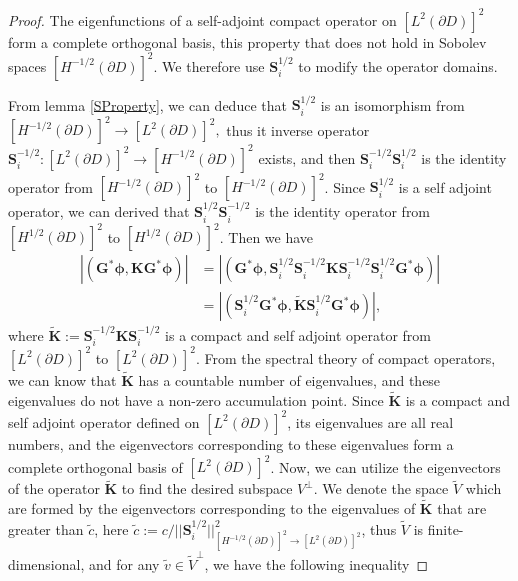 \documentclass[11pt,reqno,twoside]{amsart}
\theoremstyle{definition}
\theoremstyle{remark}
\numberwithin{equation}{section}
\begin{document}
	\begin{proof}
	The eigenfunctions of a self-adjoint compact operator on $\left[L^2(\partial D)\right]^2$ form a complete orthogonal basis, this property that does not hold in Sobolev spaces $\left[H^{-1/2}\left(\partial D\right) \right] ^2$. We therefore use $\mathbf{S}_i^{1/2}$ to modify the operator domains.
	
	From lemma \ref{SProperty}, we can deduce that $\mathbf S_{i}^{1/2}$ is an isomorphism from $\left[H^{-1/2}\left(\partial D\right) \right] ^2 \to \left[L^2\left(\partial D\right) \right] ^2 ,$  thus it inverse operator $\mathbf S_{i}^{-1/2}:\left[L^2\left(\partial D\right) \right] ^2 \to \left[H^{-1/2}\left(\partial D\right) \right] ^2$  exists, and then $\mathbf S_{i}^{-1/2} \mathbf S_{i}^{1/2}$ is the identity operator from $\left[H^{-1/2}\left(\partial D\right) \right] ^2$ to $\left[H^{-1/2}\left(\partial D\right) \right] ^2$. Since $\mathbf S_{i}^{1/2}$ is a self adjoint operator, we can derived that $\mathbf S_{i}^{1/2} \mathbf S_{i}^{-1/2}$ is the identity operator from $\left[H^{1/2}\left(\partial D\right) \right] ^2$ to $\left[H^{1/2}\left(\partial D\right) \right] ^2$. Then we have
\begin{equation}\begin{aligned} \label{eq:inequality1}
	\left|\left( \mathbf G ^* \mathbf {\phi} , \mathbf {KG}^* \mathbf {\phi}\right) \right|
	 & =\left|\left( \mathbf G ^* \mathbf {\phi}, \mathbf S_{i}^{1/2} \mathbf S_{i}^{-1/2} \mathbf K \mathbf S_{i}^{-1/2} \mathbf S_{i}^{1/2} \mathbf {G}^* \mathbf {\phi}\right)\right|\\
		& =\left|\left( \mathbf S_{i}^{1/2} \mathbf {G}^* \mathbf {\phi}, \mathbf {\tilde K}\mathbf S_{i}^{1/2} \mathbf {G}^* \mathbf {\phi} \right)\right|,
	\end{aligned}\end{equation}
	where $ \mathbf {\tilde K}:=\mathbf S_{i}^{-1/2} \mathbf K \mathbf S_{i}^{-1/2}$ is a compact and self adjoint operator from $\left[L^2\left(\partial D\right) \right] ^2$ to $\left[L^2\left(\partial D\right) \right] ^2$. From the spectral theory of compact operators, we can know that  $\mathbf {\tilde K}$ has a countable number of eigenvalues, and these eigenvalues do not have a non-zero accumulation point. Since $ \mathbf {\tilde K}$ is a compact and self adjoint  operator defined on $\left[L^2\left(\partial D\right) \right] ^2$, its eigenvalues are all real numbers, and the eigenvectors corresponding to these eigenvalues form a complete orthogonal basis of $\left[L^2\left(\partial D\right) \right] ^2$. Now, we can utilize the eigenvectors of the operator $\mathbf {\tilde K}$ to find the desired subspace $V^\perp$. We denote the space $\tilde V$ which are formed by the eigenvectors corresponding to the eigenvalues of $\mathbf {\tilde K}$ that are greater than $\tilde c$, here $\tilde c:=c/{||\mathbf S^{1/2}_i||^2_{\left[H^{-1/2}\left(\partial D\right) \right] ^2 \to \left[L^2\left(\partial D\right) \right] ^2}}$, thus $\tilde V$ is finite-dimensional, and for any $\tilde v \in {\tilde V}^{\perp} $, we have the following inequality

\end{proof}
\end{document}
